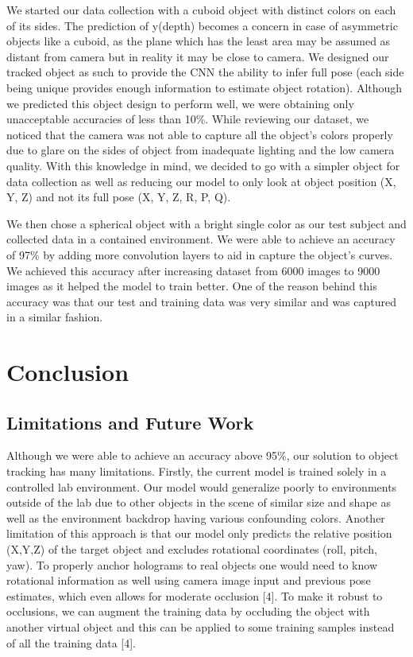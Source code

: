 \documentclass{article}
\begin{document}
We started our data collection with a cuboid object with distinct colors on each of its sides. The prediction of y(depth) becomes a concern in case of asymmetric objects like a cuboid, as the plane which has the least area may be assumed as distant from camera but in reality it may be close to camera. We designed our tracked object as such to provide the CNN the ability to infer full pose (each side being unique provides enough information to estimate object rotation). Although we predicted this object design to perform well, we were obtaining only unacceptable accuracies of less than 10\%. While reviewing our dataset, we noticed that the camera was not able to capture all the object's colors properly due to glare on the sides of object from inadequate lighting and the low camera quality. With this knowledge in mind, we decided to go with a simpler object for data collection as well as reducing our model to only look at object position (X, Y, Z) and not its full pose (X, Y, Z, R, P, Q).

We then chose a spherical object with a bright single color as our test subject and collected data in a contained environment. We were able to achieve an accuracy of 97\% by adding more convolution layers to aid in capture the object's curves.  We achieved this accuracy after increasing dataset from 6000 images to 9000 images as it helped the model to train better. One of the reason behind this accuracy was that our test and training data was very similar and was captured in a similar fashion.

\section{Conclusion}

\subsection{Limitations and Future Work}
Although we were able to achieve an accuracy above 95\%, our solution to object tracking has many limitations. Firstly, the current model is trained solely in a controlled lab environment. Our model would generalize poorly to environments outside of the lab due to other objects in the scene of similar size and shape as well as the environment backdrop having various confounding colors. Another limitation of this approach is that our model only predicts the relative position (X,Y,Z) of the target object and excludes rotational coordinates (roll, pitch, yaw). To properly anchor holograms to real objects one would need to know rotational information as well using camera image input and previous pose estimates, which even allows for moderate occlusion [4]. To make it robust to occlusions, we can augment the training data by occluding the object with another virtual object and this can be applied to some training samples instead of all the training data [4].
\end{document}
